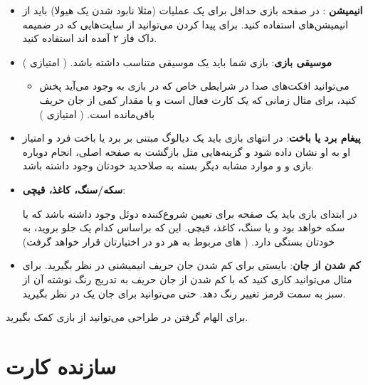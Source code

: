 \documentclass[]{article}
\begin{document}
\begin{itemize}
    \item \textbf{انیمیشن }: در صفحه بازی حداقل برای یک عملیات (مثلا نابود شدن یک هیولا) باید از انیمیشن‌های  استفاده کنید. برای پیدا کردن  می‌توانید از سایت‌هایی که در ضمیمه داک فاز ۲ آمده اند استفاده کنید.
    \item \textbf{موسیقی بازی}: بازی شما باید یک موسیقی متناسب داشته باشد. ( امتیازی ) 
    \begin{itemize}
        \item می‌توانید افکت‌های صدا در شرایطی خاص که در بازی به وجود می‌آید پخش کنید، برای مثال زمانی که یک کارت  فعال است و یا مقدار کمی از جان حریف باقی‌مانده است. ( امتیازی‌ )
    \end{itemize}
    \item \textbf{پیغام برد یا باخت}: در انتهای بازی باید یک دیالوگ مبتنی بر برد یا باخت فرد و امتیاز او به او نشان داده شود و گزینه‌هایی مثل بازگشت به صفحه اصلی، انجام دوباره بازی و و موارد مشابه دیگر بسته به صلاحدید خودتان وجود داشته باشد.
    \item \textbf{سکه/سنگ، کاغذ، قیچی}:
    
     در ابتدای بازی باید یک صفحه برای تعیین شروع‌کننده دوئل وجود داشته باشد که یا سکه خواهد بود و یا سنگ‌، کاغذ، قیچی. این که براساس کدام یک جلو بروید،‌ به خودتان بستگی دارد. (  های مربوط به هر دو در اختیارتان قرار خواهد گرفت)
     
     
    \item \textbf{کم شدن از جان}: بایستی برای کم شدن جان حریف انیمیشنی در نظر بگیرید. برای مثال می‌توانید کاری کنید که با کم شدن از جان حریف به تدریج رنگ نوشته آن از سبز به سمت قرمز تغییر رنگ دهد. حتی می‌توانید برای جان یک  در نظر بگیرید.
\end{itemize}
برای الهام گرفتن در طراحی می‌توانید از بازی  کمک بگیرید.

\section*{{\titr سازنده کارت}}
\end{document}
